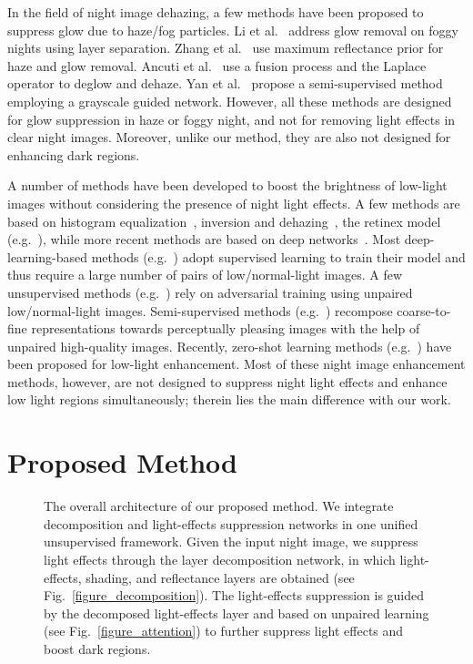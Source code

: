 \documentclass[runningheads]{llncs}
\begin{document}
In the field of night image dehazing, a few methods have been proposed to suppress glow due to haze/fog particles.  
Li et al.~\cite{li2015nighttime} address glow removal on foggy nights using layer separation.
Zhang et al.~\cite{zhang2017fast} use maximum reflectance prior for haze and glow removal.
Ancuti et al.~\cite{ancuti2016night,ancuti2020day} use a fusion process and the Laplace operator to deglow and dehaze.
Yan et al.~\cite{yan2020nighttime,yan2021self} propose a semi-supervised method~\cite{yan2020optical} employing a grayscale guided network.
However, all these methods are designed for glow suppression in haze or foggy night, and not for removing light effects in clear night images. Moreover, unlike our method, they are also not designed for enhancing dark regions.

A number of methods have been developed to boost the brightness of low-light images without considering the presence of night light effects. A few methods are based on histogram equalization~\cite{pizer1987adaptive}, inversion and dehazing~\cite{dong2011fast}, the retinex model (e.g.~\cite{fu2016weighted,li2018structure}), while more recent methods are based on deep networks~\cite{li2021low}.
Most deep-learning-based methods (e.g.~\cite{afifi2021learning,chen2018retinex,wang2019underexposed}) adopt supervised learning to train their model and thus require a large number of pairs of low/normal-light images.
A few unsupervised methods (e.g.~\cite{jiang2021enlightengan}) rely on adversarial training using unpaired low/normal-light images.
Semi-supervised methods (e.g.~\cite{yang2020fidelity,yang2021band}) recompose coarse-to-fine representations towards perceptually pleasing images with the help of unpaired high-quality images.
Recently, zero-shot learning methods (e.g.~\cite{li2021learning,guo2020zero}) have been proposed for low-light enhancement. 
Most of these night image enhancement methods, however, are not designed to suppress night light effects and enhance low light regions simultaneously; therein lies the main difference with our work.


\section{Proposed Method}
\label{sec:method}

\begin{figure}[t!]
	\captionsetup[subfloat]{farskip=1pt}
	\centering
	\caption{The overall architecture of our proposed method.
We integrate decomposition and light-effects suppression networks in one unified unsupervised framework.
Given the input night image, we suppress light effects through the layer decomposition network, in which light-effects, shading, and reflectance layers are obtained (see Fig.~\ref{figure_decomposition}). 
The light-effects suppression is guided by the decomposed light-effects layer  and based on unpaired learning (see Fig.~\ref{figure_attention}) to further suppress light effects and boost dark regions.}
	\label{figure_model}
\end{figure}
\end{document}
